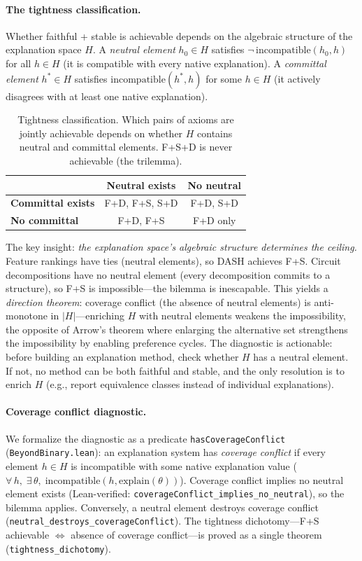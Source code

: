 \documentclass{article}
\begin{document}
\paragraph{The tightness classification.}
Whether faithful + stable is achievable depends on the algebraic structure
of the explanation space $H$.
A \emph{neutral element} $h_0 \in H$ satisfies
$\neg\,\mathrm{incompatible}(h_0, h)$ for all $h \in H$ (it is compatible
with every native explanation).
A \emph{committal element} $h^* \in H$ satisfies
$\mathrm{incompatible}(h^*, h)$ for some $h \in H$ (it actively disagrees
with at least one native explanation).

\begin{table}[t]
\centering
\caption{Tightness classification. Which pairs of axioms are jointly
achievable depends on whether $H$ contains neutral and committal
elements. F+S+D is never achievable (the trilemma).}
\label{tab:tightness}
\begin{tabular}{@{}lcc@{}}
\toprule
& Neutral exists & No neutral \\
\midrule
\textbf{Committal exists} & F+D,\; F+S,\; S+D & F+D,\; S+D \\
\textbf{No committal}     & F+D,\; F+S         & F+D only \\
\bottomrule
\end{tabular}
\end{table}

The key insight: \emph{the explanation space's algebraic structure
determines the ceiling.}
Feature rankings have ties (neutral elements), so DASH achieves F+S.
Circuit decompositions have no neutral element (every decomposition commits
to a structure), so F+S is impossible---the bilemma is inescapable.
This yields a \emph{direction theorem}: coverage conflict (the absence of neutral elements) is
anti-monotone in $|H|$---enriching $H$ with neutral elements weakens the
impossibility, the opposite of Arrow's theorem where enlarging the alternative set
strengthens the impossibility by enabling preference cycles.
The diagnostic is actionable: before building an explanation method,
check whether $H$ has a neutral element.
If not, no method can be both faithful and stable, and the only resolution
is to enrich $H$ (e.g., report equivalence classes instead of individual
explanations).

\paragraph{Coverage conflict diagnostic.}
We formalize the diagnostic as a predicate \texttt{hasCoverageConflict}
(\texttt{BeyondBinary.lean}):
an explanation system has \emph{coverage conflict} if every element
$h \in H$ is incompatible with some native explanation value
($\forall\, h,\; \exists\, \theta,\;
\mathrm{incompatible}(h, \mathrm{explain}(\theta))$).
Coverage conflict implies no neutral element exists
(Lean-verified: \texttt{coverageConflict\_implies\_no\_neutral}),
so the bilemma applies.
Conversely, a neutral element destroys coverage conflict
(\texttt{neutral\_destroys\_coverageConflict}).
The tightness dichotomy---F+S achievable $\Leftrightarrow$ absence
of coverage conflict---is proved as a single theorem
(\texttt{tightness\_dichotomy}).
\end{document}
